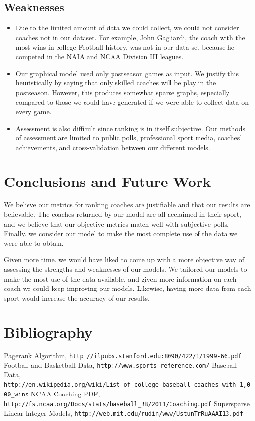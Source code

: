 \documentclass[11pt,notitlepage]{article}
\begin{document}
\subsection{Weaknesses}
\begin{itemize}
\item Due to the limited amount of data we could collect, we could not consider coaches not in our dataset. For example, John Gagliardi, the coach with the most wins in college Football history, was not in our data set because he competed in the NAIA and NCAA Division III leagues. 

\item Our graphical model used only postseason games as input. We justify this heuristically by saying that only skilled coaches will be play in the postseason. However, this produces somewhat sparse graphs, especially compared to those we could have generated if we were able to collect data on every game.

\item Assessment is also difficult since ranking is in itself subjective. Our methods of assessment are limited to public polls, professional sport media, coaches' achievements, and cross-validation between our different models.

\end{itemize}

\section{Conclusions and Future Work}
We believe our metrics for ranking coaches are justifiable and that our results are believable. The coaches returned by our model are all acclaimed in their sport, and we believe that our objective metrics match well with subjective polls. Finally, we consider our model to make the most complete use of the data we were able to obtain.

Given more time, we would have liked to come up with a more objective way of assessing the strengths and weaknesses of our models. We tailored our models to make the most use of the data available, and given more information on each coach we could keep improving our models. Likewise, having more data from each sport would increase the accuracy of our results.


\pagebreak

\section{Bibliography}
\begin{thebibliography}{9}

 Pagerank Algorithm,
\verb|http://ilpubs.stanford.edu:8090/422/1/1999-66.pdf|
 Football and Basketball Data,
\verb|http://www.sports-reference.com/|
 Baseball Data,
\verb|http://en.wikipedia.org/wiki/List_of_college_baseball_coaches_with_1,000_wins|
 NCAA Coaching PDF,
\verb|http://fs.ncaa.org/Docs/stats/baseball_RB/2011/Coaching.pdf|
 Supersparse Linear Integer Models,
\verb|http://web.mit.edu/rudin/www/UstunTrRuAAAI13.pdf|

\end{thebibliography}
\end{document}
